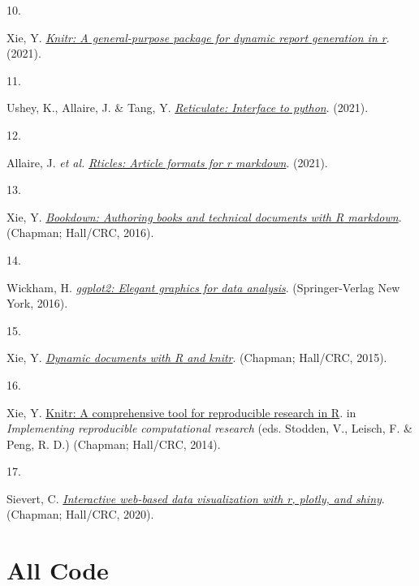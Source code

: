 \documentclass{article}
\newlength{\csllabelwidth}
\newlength{\cslhangindent}
\newenvironment{CSLReferences}[2] %
 {%
  \setlength{\parindent}{0pt}
  \ifodd #1 \everypar{\setlength{\hangindent}{\cslhangindent}}\ignorespaces\fi
  \ifnum #2 > 0
  \setlength{\parskip}{#2\baselineskip}
  \fi
 }%
 {}
\newcommand{\CSLLeftMargin}[1]{\parbox[t]{\csllabelwidth}{#1}}
\newcommand{\CSLRightInline}[1]{\parbox[t]{\linewidth - \csllabelwidth}{#1}\break}
\begin{document}
\begin{CSLReferences}{0}{0}
\leavevmode{}%
\CSLLeftMargin{10. }
\CSLRightInline{Xie, Y. \emph{\href{https://yihui.org/knitr/}{Knitr: A
general-purpose package for dynamic report generation in r}}. (2021).}

\leavevmode{}%
\CSLLeftMargin{11. }
\CSLRightInline{Ushey, K., Allaire, J. \& Tang, Y.
\emph{\href{https://github.com/rstudio/reticulate}{Reticulate: Interface
to python}}. (2021).}

\leavevmode{}%
\CSLLeftMargin{12. }
\CSLRightInline{Allaire, J. \emph{et al.}
\emph{\href{https://github.com/rstudio/rticles}{Rticles: Article formats
for r markdown}}. (2021).}

\leavevmode{}%
\CSLLeftMargin{13. }
\CSLRightInline{Xie, Y.
\emph{\href{https://bookdown.org/yihui/bookdown}{Bookdown: Authoring
books and technical documents with {R} markdown}}. (Chapman; Hall/CRC,
2016).}

\leavevmode{}%
\CSLLeftMargin{14. }
\CSLRightInline{Wickham, H.
\emph{\href{https://ggplot2.tidyverse.org}{ggplot2: Elegant graphics for
data analysis}}. (Springer-Verlag New York, 2016).}

\leavevmode{}%
\CSLLeftMargin{15. }
\CSLRightInline{Xie, Y. \emph{\href{https://yihui.org/knitr/}{Dynamic
documents with {R} and knitr}}. (Chapman; Hall/CRC, 2015).}

\leavevmode{}%
\CSLLeftMargin{16. }
\CSLRightInline{Xie, Y.
\href{http://www.crcpress.com/product/isbn/9781466561595}{Knitr: A
comprehensive tool for reproducible research in {R}}. in
\emph{Implementing reproducible computational research} (eds. Stodden,
V., Leisch, F. \& Peng, R. D.) (Chapman; Hall/CRC, 2014).}

\leavevmode{}%
\CSLLeftMargin{17. }
\CSLRightInline{Sievert, C.
\emph{\href{https://plotly-r.com}{Interactive web-based data
visualization with r, plotly, and shiny}}. (Chapman; Hall/CRC, 2020).}

\end{CSLReferences}

\appendix

\hypertarget{all-code}{%
\section{All Code}\label{all-code}}
\end{document}
